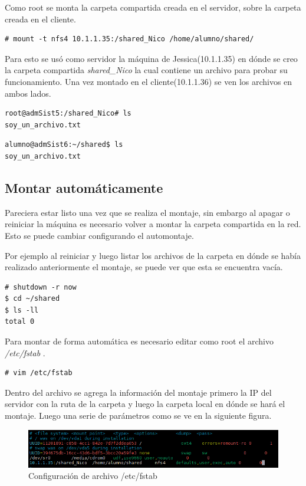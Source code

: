 \documentclass[12pt]{article}
\begin{document}
Como root se monta la carpeta compartida creada en el servidor, sobre la carpeta creada en el cliente. 
\begin{lstlisting}[frame=single]
# mount -t nfs4 10.1.1.35:/shared_Nico /home/alumno/shared/
\end{lstlisting}

Para esto se usó como servidor la máquina de Jessica(10.1.1.35) en dónde se creo la carpeta compartida \emph{shared\_Nico} la cual contiene un archivo para probar su funcionamiento. Una vez montado en el cliente(10.1.1.36) se ven los archivos en ambos lados.
\bigskip
\begin{lstlisting}[frame=single]
root@admSist5:/shared_Nico# ls
soy_un_archivo.txt
\end{lstlisting}

\begin{lstlisting}[frame=single]
alumno@admSist6:~/shared$ ls
soy_un_archivo.txt
\end{lstlisting}

\subsection{Montar automáticamente}

Pareciera estar listo una vez que se realiza el montaje, sin embargo al apagar o reiniciar la máquina es necesario volver a montar la carpeta compartida en la red. Esto se puede cambiar configurando el automontaje.


Por ejemplo al reiniciar y luego listar los archivos de la carpeta en dónde se había realizado anteriormente el montaje, se puede ver que esta se encuentra vacía.
\begin{lstlisting}[frame=single]
# shutdown -r now
$ cd ~/shared
$ ls -ll
total 0
\end{lstlisting}

Para montar de forma automática es necesario editar como root el archivo \emph{/etc/fstab} .
\begin{lstlisting}[frame=single]
# vim /etc/fstab
\end{lstlisting}

Dentro del archivo se agrega la información del montaje primero la IP del servidor con la ruta de la carpeta y luego la carpeta local en dónde se hará el montaje. Luego una serie de parámetros como se ve en la siguiente figura. 

\begin{figure}[!h]
   \centering
   \includegraphics[scale=.85]{imgs/nfs_auto.PNG}
   \caption{Configuración de archivo /etc/fstab}
   \label{fig10}
\end{figure}
\end{document}
